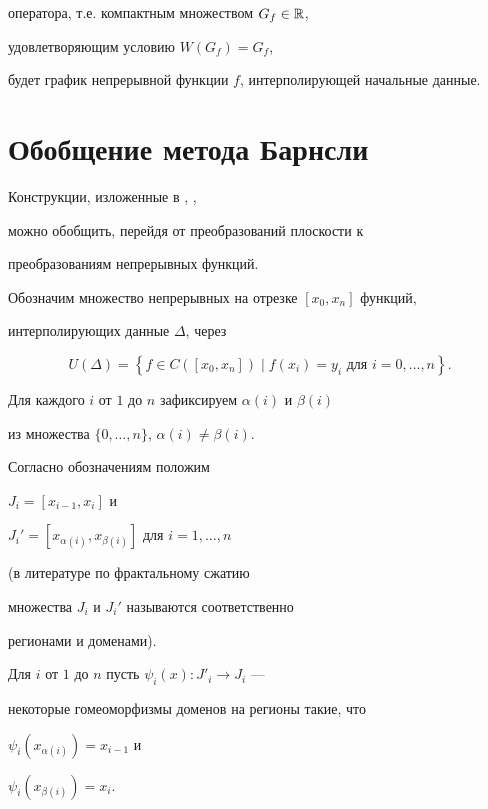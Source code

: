 оператора, т.е. компактным множеством $ G_f \in {\Bbb R} $,


удовлетворяющим условию $ W(G_f) = G_f$,


будет график непрерывной функции $f$, интерполирующей начальные данные.





\section{Обобщение метода Барнсли}





Конструкции, изложенные в \cite{barnsley1}, \cite{recbar},


можно обобщить, перейдя от преобразований плоскости к


преобразованиям непрерывных функций.


Обозначим множество непрерывных на отрезке $[x_0,x_{n}]$ функций,


интерполирующих данные $\Delta$, через


\begin{equation} \label{udelta}


U(\Delta)= \left\{ f \in C([x_{0},x_{n}])


\mid f(x_i) = y_i \text{ для } i=0, \dotsc,n \right\}.


\end{equation}


Для каждого $i$ от $1$ до $n$ зафиксируем $\alpha(i)$ и $\beta(i)$


из множества $\{0,\dotsc,n\}$, $\alpha(i) \ne \beta(i)$.


Согласно обозначениям \cite{recbar} положим


$J_{i}=[ x_{i-1} , x_{i} ]$ и


$J_i' = [x_{\alpha(i)} ,x_{\beta(i)}]$ для $i = 1, \dotsc , n$


(в литературе по фрактальному сжатию


множества $J_i$ и $J_i'$ называются соответственно


регионами и доменами).


Для $i$ от $1$ до $n$ пусть $\psi_i(x): J'_i \to J_i $ ---


некоторые гомеоморфизмы доменов на регионы такие, что


$\psi_i(x_{\alpha(i)})= x_{i-1}$ и


$\psi_i(x_{\beta(i)}) = x_{i}$.



